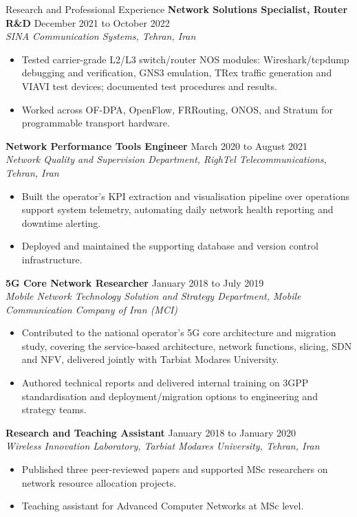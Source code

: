 \documentclass{resume}
\newcommand{\entry}[2]{{\bf #1} \hfill {#2}\\}
\newcommand{\sub}[1]{{\em #1}\par}
\begin{document}
\begin{rSection}{Research and Professional Experience}
\entry{Network Solutions Specialist, Router R\&D}{December 2021 to October 2022}
\sub{SINA Communication Systems, Tehran, Iran}
\begin{itemize}
  \item Tested carrier-grade L2/L3 switch/router NOS modules: Wireshark/tcpdump debugging and verification, GNS3 emulation, TRex traffic generation and VIAVI test devices; documented test procedures and results.
  \item Worked across OF-DPA, OpenFlow, FRRouting, ONOS, and Stratum for programmable transport hardware.
\end{itemize}

\entry{Network Performance Tools Engineer}{March 2020 to August 2021}
\sub{Network Quality and Supervision Department, RighTel Telecommunications, Tehran, Iran}
\begin{itemize}
  \item Built the operator's KPI extraction and visualisation pipeline over operations support system telemetry, automating daily network health reporting and downtime alerting.
  \item Deployed and maintained the supporting database and version control infrastructure.
\end{itemize}

\entry{5G Core Network Researcher}{January 2018 to July 2019}
\sub{Mobile Network Technology Solution and Strategy Department, Mobile Communication Company of Iran (MCI)}
\begin{itemize}
  \item Contributed to the national operator's 5G core architecture and migration study, covering the service-based architecture, network functions, slicing, SDN and NFV, delivered jointly with Tarbiat Modares University.
  \item Authored technical reports and delivered internal training on 3GPP standardisation and deployment/migration options to engineering and strategy teams.
\end{itemize}

\entry{Research and Teaching Assistant}{January 2018 to January 2020}
\sub{Wireless Innovation Laboratory, Tarbiat Modares University, Tehran, Iran}
\begin{itemize}
  \item Published three peer-reviewed papers and supported MSc researchers on network resource allocation projects.
  \item Teaching assistant for Advanced Computer Networks at MSc level.
\end{itemize}

\end{rSection}
\end{document}
